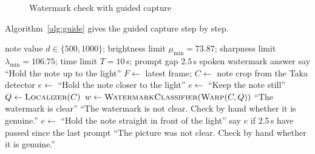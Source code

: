 \begin{figure}[H]
\centering
{}
\caption{Watermark check with guided capture}
\label{fig:wm_flow}
\end{figure}

Algorithm~\ref{alg:guide} gives the guided capture step by step.

\begin{algorithm}[!htbp]
\caption{Guided back-lit capture and watermark check}
\label{alg:guide}
\begin{algorithmic}[1]
\Require note value $d \in \{500, 1000\}$; brightness limit $\mu_{\min}=73.87$; sharpness limit $\lambda_{\min}=106.75$; time limit $T=10$\,s; prompt gap $2.5$\,s
\Ensure spoken watermark answer
\State say ``Hold the note up to the light''
  \State $F \gets$ latest frame; \; $C \gets$ note crop from the Taka detector
   \State $e \gets$ ``Hold the note closer to the light''
   \State $e \gets$ ``Keep the note still''
  \Else
    \State $Q \gets \textsc{Localizer}(C)$ 
      \State $w \gets \textsc{WatermarkClassifier}(\textsc{Warp}(C, Q))$
       \State \Return ``The watermark is clear'' \Else \State \Return ``The watermark is not clear. Check by hand whether it is genuine.'' \EndIf
    \EndIf
    \State $e \gets$ ``Hold the note straight in front of the light''
  \EndIf
  \State say $e$ if 2.5\,s have passed since the last prompt
\EndWhile
\State \Return ``The picture was not clear. Check by hand whether it is genuine.''
\end{algorithmic}
\end{algorithm}


